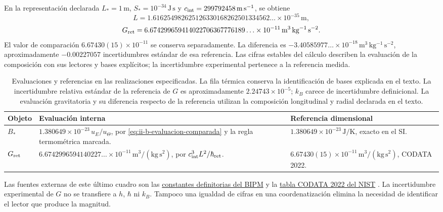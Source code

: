 En la representación declarada \(L_*=1\,\mathrm m\),
\(S_*=10^{-34}\,\mathrm{J\,s}\) y
\(c_{\rm int}=299792458\,\mathrm{m\,s^{-1}}\), se obtiene
\[
 L=1.616254982625126330168262501334562\ldots\times10^{-35}
 \,\mathrm m,
\]
\[
 G_{\rm ret}=6.674299659414022706367776189\ldots\times10^{-11}
 \,\mathrm{m^3\,kg^{-1}\,s^{-2}}.
\]
El valor de comparación \(6.67430(15)\times10^{-11}\) se conserva
separadamente. La diferencia es
\(-3.40585977\ldots\times10^{-18}\,\mathrm{m^3\,kg^{-1}\,s^{-2}}\),
aproximadamente \(-0.00227057\) incertidumbres estándar de esa referencia.
Las cifras estables del cálculo describen la evaluación de la composición
con sus lectores y bases explícitos; la incertidumbre experimental pertenece
a la referencia medida.

\begin{table}[htbp]
\centering\small
\begin{tabularx}{\linewidth}{@{}lXX@{}}
\toprule
Objeto & Evaluación interna & Referencia dimensional\\
\midrule
\(B_*\) & \(1.380649\times10^{-23}\,u_E/u_\Theta\),
por \eqref{eq:ii-b-evaluacion-comparada} y la regla termométrica marcada.
& \(1.380649\times10^{-23}\,\mathrm{J/K}\), exacto en el SI.\\[4pt]
\(G_{\rm ret}\) & \(6.6742996594140227\ldots\times10^{-11}\,
\mathrm{m^3/(kg\,s^2)}\), por \(c_{\rm int}^3L^2/\hbar_{\rm ret}\).
& \(6.67430(15)\times10^{-11}\,\mathrm{m^3/(kg\,s^2)}\), CODATA 2022.\\
\bottomrule
\end{tabularx}
\caption{Evaluaciones y referencias en las realizaciones especificadas.
La fila térmica conserva la identificación de bases explicada en el texto.
La incertidumbre
relativa estándar de la referencia de \(G\) es aproximadamente
\(2.24743\times10^{-5}\); \(k_B\) carece de incertidumbre definicional.
La evaluación gravitatoria y su diferencia respecto de la referencia
utilizan la composición longitudinal y radial declarada en el texto.}
\label{tab:ii-kb-g-cartas}
\end{table}

Las fuentes externas de este último cuadro son las
\href{https://www.bipm.org/en/measurement-units/si-defining-constants}
{constantes definitorias del BIPM} y la
\href{https://physics.nist.gov/cuu/Constants/Table/allascii.txt}
{tabla CODATA 2022 del NIST} \cite{codata2022}.
La incertidumbre experimental de \(G\) no se transfiere a \(h\),
\(\hbar\) ni \(k_B\). Tampoco una igualdad de cifras en una coordenatización
elimina la necesidad de identificar el lector que produce la magnitud.

